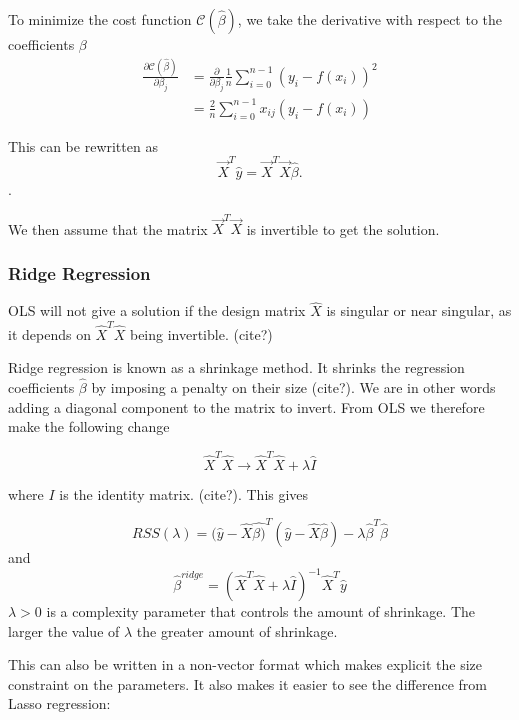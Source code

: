 To minimize the cost function $\mathcal{C}(\hat{\beta})$, we take the derivative
with respect to the coefficients $\beta$
\begin{align}
	\frac{\partial \mathcal{C}(\hat{\beta})}{\partial {\beta_j}}
	&= \frac{\partial}{\partial \beta_j}\frac{1}{n}\sum\limits_{i=0}^{n-1} (y_i - f(x_i))^2\\
  &= \frac{2}{n}\sum\limits_{i=0}^{n-1} x_{ij}(y_i - f(x_i))
\end{align}

This can be rewritten as
\begin{equation}
	\vec{X}^T\hat{y} = \vec{X}^T\vec{X}\hat{\beta}.
\end{equation}.

We then assume that the matrix \(\vec{X}^T\vec{X}\)
is invertible to get the solution. ~\cite{James2000}

\subsubsection{Ridge Regression}\label{section:ridge}
OLS will not give a solution if the design matrix \(\hat{X}\) is singular
or near singular, as it depends on \(\hat{X}^T\hat{X}\) being invertible. (cite?)

Ridge regression is known as a shrinkage method. It shrinks the regression
coefficients \(\hat{\beta}\) by imposing a penalty on their size (cite?). We are in other words adding a diagonal component
to the matrix to invert. From OLS we therefore make the following change

\begin{equation}
	\hat{X}^T\hat{X} \rightarrow \hat{X}^T\hat{X} + \lambda \hat{I}
\end{equation}

where $I$ is the identity matrix. (cite?).
This gives

\begin{equation}
	RSS(\lambda) = (\hat{y}-\hat{X}\hat{\beta)}^T(\hat{y}
	- \hat{X}\hat{\beta})
	- \lambda \hat{\beta}^T\hat{\beta}
\end{equation}
and
\begin{equation}
	\hat{\beta}^{ridge} = (\hat{X}^T\hat{X}
	+ \lambda \hat{I})^{-1}\hat{X}^T\hat{y}
\end{equation}
\(\lambda > 0 \) is a complexity parameter that controls the amount
of shrinkage. The larger the value of \(\lambda\) the greater amount of
shrinkage.
\cite{James2000}

This can also be written in a non-vector format which makes
explicit the size constraint on the parameters.
It also makes it easier to see the difference from Lasso regression:

